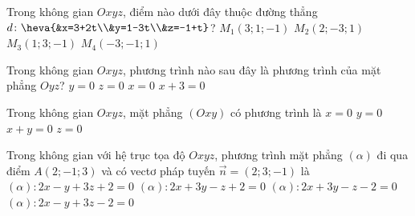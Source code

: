 

\begin{ex}%
	Trong không gian  $Oxyz$, điểm nào dưới đây thuộc đường thẳng $d\colon\heva{&x=3+2t\\&y=1-3t\\&z=-1+t}$?
	 \choice
		{\True $M_1\left(3;1;-1\right)$} 
		{$M_2\left(2;-3;1\right)$} 
		{$M_3\left(1;3;-1\right)$} 
		{$M_{4}\left(-3;-1;1\right)$} 
\end{ex}

\begin{ex}%
	Trong không  gian $Oxyz$, phương trình nào sau đây là phương trình của mặt phẳng $Oyz$?
	 \choice
		{$y  = 0$}
		{$z =  0$}
		{\True  $x = 0$}
		{$x + 3  = 0$}
\end{ex}

\begin{ex}%
	Trong không  gian $Oxyz$, mặt phẳng $(Oxy)$ có phương trình là
	\choice 
		 {$x=0$}
		{$y=0$} 
		 {$x+y=0$}
		{\True  $z=0$}
\end{ex}

\begin{ex}%
	Trong không gian với hệ trục tọa độ $Oxyz$, phương trình mặt phẳng $\left(\alpha\right)$ đi qua điểm $A(2;-1;3)$ và có vectơ pháp tuyến  $\overrightarrow{n}=(2;3;-1)$ là
	\choice 
		 {$(\alpha)\colon 2x-y+3z+2=0$}
		{\True $(\alpha)\colon  2x+3y-z+2=0$}
		 {$(\alpha)\colon 2x+3y-z-2=0$}
		 {$(\alpha)\colon 2x-y+3z-2=0$}
\end{ex}

